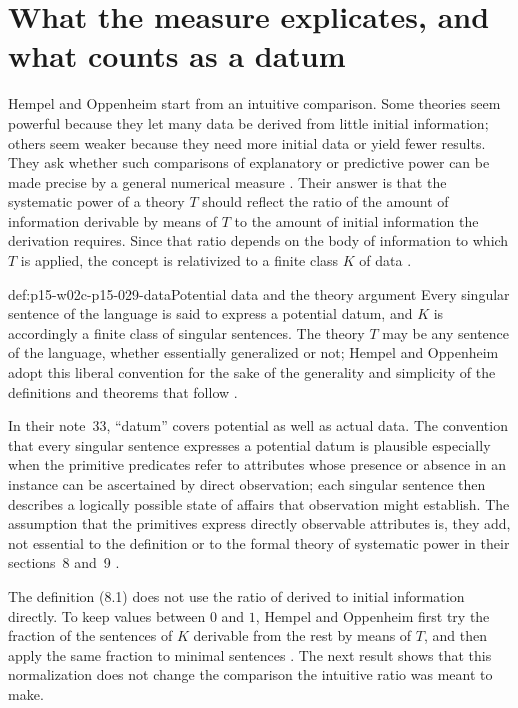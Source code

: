 \section{What the measure explicates, and what counts as a datum}
\label{sec:p15-w02c-p15-029-data}

Hempel and Oppenheim start from an intuitive comparison. Some theories
seem powerful because they let many data be derived from little initial
information; others seem weaker because they need more initial data or
yield fewer results. They ask whether such comparisons of explanatory or
predictive power can be made precise by a general numerical measure
\cite[p.~164]{HempelOppenheim1948Explanation}. Their answer is that the
systematic power of a theory \(T\) should reflect the ratio of the amount
of information derivable by means of \(T\) to the amount of initial
information the derivation requires. Since that ratio depends on the body
of information to which \(T\) is applied, the concept is relativized to a
finite class \(K\) of data \cite[pp.~164--165]{HempelOppenheim1948Explanation}.

\begin{hbconvention}{def:p15-w02c-p15-029-data}{Potential data and the theory argument}
Every singular sentence of the language is said to express a potential
datum, and \(K\) is accordingly a finite class of singular sentences.
The theory \(T\) may be any sentence of the language, whether essentially
generalized or not; Hempel and Oppenheim adopt this liberal convention
for the sake of the generality and simplicity of the definitions and
theorems that follow \cite[p.~165]{HempelOppenheim1948Explanation}.

In their note~33, ``datum'' covers potential as well as actual data. The
convention that every singular sentence expresses a potential datum is
plausible especially when the primitive predicates refer to attributes
whose presence or absence in an instance can be ascertained by direct
observation; each singular sentence then describes a logically possible
state of affairs that observation might establish. The assumption that
the primitives express directly observable attributes is, they add, not
essential to the definition or to the formal theory of systematic power
in their sections~8 and~9 \cite[p.~165, n.~33]{HempelOppenheim1948Explanation}.
\end{hbconvention}

The definition (8.1) does not use the ratio of derived to initial
information directly. To keep values between \(0\) and \(1\), Hempel and
Oppenheim first try the fraction of the sentences of \(K\) derivable from
the rest by means of \(T\), and then apply the same fraction to minimal
sentences \cite[pp.~165--166]{HempelOppenheim1948Explanation}. The next
result shows that this normalization does not change the comparison the
intuitive ratio was meant to make.

